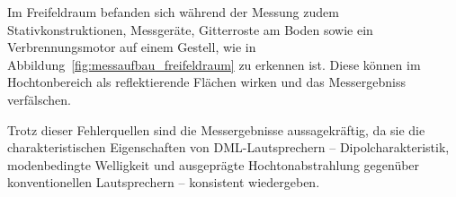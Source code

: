 Im Freifeldraum befanden sich während der Messung zudem Stativkonstruktionen, Messgeräte, Gitterroste am Boden sowie ein Verbrennungsmotor auf einem Gestell, wie in Abbildung~\ref{fig:messaufbau_freifeldraum} zu erkennen ist. Diese können im Hochtonbereich als reflektierende Flächen wirken und das Messergebniss verfälschen.

Trotz dieser Fehlerquellen sind die Messergebnisse aussagekräftig, da sie die charakteristischen Eigenschaften von DML-Lautsprechern -- Dipolcharakteristik, modenbedingte Welligkeit und ausgeprägte Hochtonabstrahlung gegenüber konventionellen Lautsprechern -- konsistent wiedergeben.





